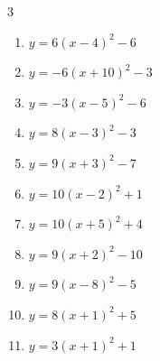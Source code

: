 \begin{multicols}{3}
\begin{enumerate}
        \phantom{$\displaystyle 頂点\left( 3 , 2 \right)$}

  \item $\displaystyle y=6\left( x-4\right)^{2}-6$

        \phantom{$\displaystyle 頂点\left( 4 , -6 \right)$}

  \item $\displaystyle y=-6\left( x+10\right)^{2}-3$

        \phantom{$\displaystyle 頂点\left( -10 , -3 \right)$}

  \item $\displaystyle y=-3\left( x-5\right)^{2}-6$

        \phantom{$\displaystyle 頂点\left( 5 , -6 \right)$}

\columnbreak %

  \item $\displaystyle y=8\left( x-3\right)^{2}-3$

        \phantom{$\displaystyle 頂点\left( 3 , -3 \right)$}

  \item $\displaystyle y=9\left( x+3\right)^{2}-7$

        \phantom{$\displaystyle 頂点\left( -3 , -7 \right)$}

  \item $\displaystyle y=10\left( x-2\right)^{2}+1$

        \phantom{$\displaystyle 頂点\left( 2 , 1 \right)$}

  \item $\displaystyle y=10\left( x+5\right)^{2}+4$

        \phantom{$\displaystyle 頂点\left( -5 , 4 \right)$}

  \item $\displaystyle y=9\left( x+2\right)^{2}-10$

        \phantom{$\displaystyle 頂点\left( -2 , -10 \right)$}

  \item $\displaystyle y=9\left( x-8\right)^{2}-5$

        \phantom{$\displaystyle 頂点\left( 8 , -5 \right)$}

  \item $\displaystyle y=8\left( x+1\right)^{2}+5$

        \phantom{$\displaystyle 頂点\left( -1 , 5 \right)$}

  \item $\displaystyle y=3\left( x+1\right)^{2}+1$


\end{enumerate}
\end{multicols}
